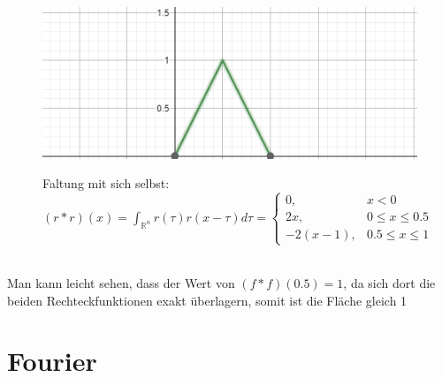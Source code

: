 \documentclass[12pt,a4paper]{article}
\newcommand{\nl}{\\[0.1cm]}
\begin{document}
\begin{minipage}{\linewidth}
\centering
\begin{minipage}{0.45\linewidth}
\begin{figure}[H]
\includegraphics[width=\linewidth]{./resources/rechteck_faltung.png}
\end{figure}
\end{minipage}
\hspace{0.05\linewidth}
\begin{minipage}{0.45\linewidth}
\begin{figure}[H]
Faltung mit sich selbst: $(r\ast r)(x) = \displaystyle \int_{\mathbb{R}^n} r(\tau)r(x-\tau)d\tau = \begin{cases} 0,& x<0 \\ 2x, & 0 \leq x \leq 0.5 \\ -2(x-1), & 0.5 \leq x \leq 1 \end{cases}$
\end{figure}
\end{minipage}
\end{minipage}
\nl
Man kann leicht sehen, dass der Wert von $(f \ast f) (0.5) = 1$, da sich dort die beiden Rechteckfunktionen exakt überlagern, somit ist die Fläche gleich 1


\section{Fourier}
\end{document}
